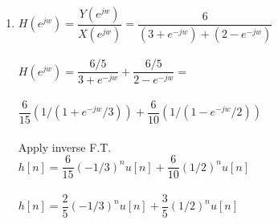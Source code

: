 \documentclass[10pt,a4paper, margin=1in]{article}
\begin{document}
\begin{enumerate}
\begin{enumerate}
    \item %
    $H(e^{jw}) = \dfrac{Y(e^{jw})}{X(e^{jw})} = \dfrac{6}{(3+ e^{-jw}) + (2 - e^{-jw})}$ \\ \\
    $H(e^{jw}) = \dfrac{6/5}{3 + e^{-jw}} + \dfrac{6/5}{2 - e^{-jw}} = $ \\ \\
    $\dfrac{6}{15} (1/(1 + e^{-jw}/3)) + \dfrac{6}{10}(1/(1 - e^{-jw}/2))$ \\ \\
    Apply inverse F.T. \\
    $h[n] = \dfrac{6}{15} (-1/3)^n u[n] + \dfrac{6}{10} (1/2)^n u[n]$ \\ \\
    $h[n] = \dfrac{2}{5} (-1/3)^n u[n] + \dfrac{3}{5} (1/2)^n u[n]$ \\ \\
    \end{enumerate}

\end{enumerate}
\end{document}
